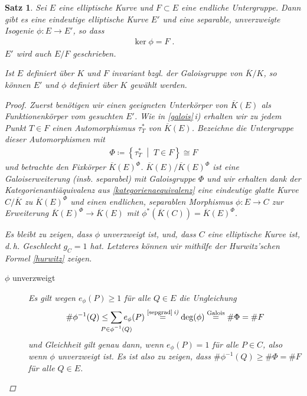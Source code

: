 \documentclass[english, german, parskip=half]{scrartcl}
\newtheorem{Satz}{Satz}[section]
\theoremstyle{definition}
\theoremstyle{remark}
\newcommand*{\K}{\ensuremath{K}} %
\newcommand*{\algK}{\ensuremath{\overline K}} %
\newcommand{\F}{F} %
\begin{document}
\begin{Satz}
  Sei $E$ eine elliptische Kurve und $\F\subset E$ eine endliche
  Untergruppe.
  Dann gibt es eine eindeutige elliptische Kurve $E'$ und eine
  separable, unverzweigte Isogenie $\phi\colon E\to E'$, so dass
  \begin{gather*}
    \ker\phi = \F \;.
  \end{gather*}
  $E'$ wird auch $E/\F$ geschrieben.

  Ist $E$ definiert über $K$ und $\F$ invariant bzgl. der Galoisgruppe
  von $\algK/\K$, so können $E'$ und $\phi$ definiert über $K$ gewählt
  werden.
  \begin{proof}
    Zuerst benötigen wir einen geeigneten Unterkörper von $\algK(E)$
    als Funktionenkörper vom gesuchten $E'$.
    Wie in \autoref{galois}\,\emph{i)} erhalten wir zu jedem Punkt
    $T\in \F$ einen Automorphismus $\tau_T^*$ von $\algK(E)$.
    Bezeichne die Untergruppe dieser Automorphismen mit 
    \begin{gather*}
      \Phi\coloneqq\left\{ \tau_T^* \;\middle|\; T\in \F \right\}
      \cong F
    \end{gather*}
    und betrachte den Fixkörper $\algK(E)^\Phi$.    
    $\algK(E)/\algK(E)^\Phi$ ist eine Galoiserweiterung
    (insb. separabel) mit Galoisgruppe $\Phi$ und wir erhalten dank
    der Kategorienantiäquivalenz aus \autoref{kategorienaequivalenz}
    eine eindeutige glatte Kurve $C/\algK$ zu $\algK(E)^\Phi$ und
    einen endlichen, separablen Morphismus $\phi\colon E\to C$ zur
    Erweiterung $\algK(E)^\Phi\to\algK(E)$ mit
    $\phi^*(\algK(C))=\algK(E)^\Phi$.
    
    Es bleibt zu zeigen, dass $\phi$ unverzweigt ist, und, dass $C$
    eine elliptische Kurve ist, d.\,h. Geschlecht $g_C=1$ hat.
    Letzteres können wir mithilfe der Hurwitz'schen Formel
    \autoref{hurwitz} zeigen.

    \begin{description}
    \item[$\phi$ unverzweigt]
      Es gilt wegen $e_\phi(P)\geq1$ für alle $Q\in E$ die Ungleichung
      \begin{gather*}
        \#\phi^{-1}(Q)
        \leq
        \sum_{\mathclap{P\in\phi^{-1}(Q)}} e_\phi(P)
        \overset{\text{\autoref{sepgrad}\,\emph{i)}}}{=}
        \deg(\phi)
        \overset{\text{Galois}}{=}
        \#\Phi
        =\# \F
      \end{gather*}
      und Gleichheit gilt genau dann, wenn $e_\phi(P)=1$ für alle
      $P\in C$, also wenn $\phi$ unverzweigt ist.
      Es ist also zu zeigen, dass $\#\phi^{-1}(Q)\geq\#\Phi=\# \F$ für alle 
      $Q\in E$.


\end{description}
\end{proof}
\end{Satz}
\end{document}
